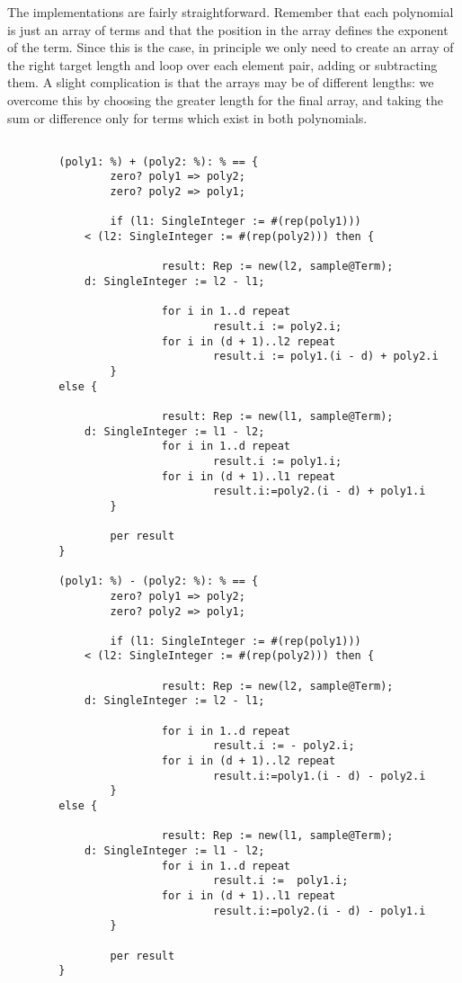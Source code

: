 The implementations are fairly straightforward. 
Remember that each polynomial
is just an array of terms and that the position in the array defines
the exponent of the term. Since this is the case,
in principle we only need to 
create an array of the right target length and loop over each element
pair, adding or subtracting them.
A slight complication is that the arrays may be of different lengths:
we overcome this by choosing the greater length for the final array,
and taking the sum or difference only for terms which exist in both
polynomials.

\begin{small}
\begin{verbatim}

        (poly1: %) + (poly2: %): % == {
                zero? poly1 => poly2;
                zero? poly2 => poly1;

                if (l1: SingleInteger := #(rep(poly1)))
		    < (l2: SingleInteger := #(rep(poly2))) then {

                        result: Rep := new(l2, sample@Term);
			d: SingleInteger := l2 - l1;

                        for i in 1..d repeat 
                                result.i := poly2.i;
                        for i in (d + 1)..l2 repeat 
                                result.i := poly1.(i - d) + poly2.i
                }
		else {

                        result: Rep := new(l1, sample@Term);
			d: SingleInteger := l1 - l2;
                        for i in 1..d repeat 
                                result.i := poly1.i;
                        for i in (d + 1)..l1 repeat 
                                result.i:=poly2.(i - d) + poly1.i
                }

                per result
        }

        (poly1: %) - (poly2: %): % == {
                zero? poly1 => poly2;
                zero? poly2 => poly1;

                if (l1: SingleInteger := #(rep(poly1)))
		    < (l2: SingleInteger := #(rep(poly2))) then {

                        result: Rep := new(l2, sample@Term);
			d: SingleInteger := l2 - l1;

                        for i in 1..d repeat 
                                result.i := - poly2.i;
                        for i in (d + 1)..l2 repeat 
                                result.i:=poly1.(i - d) - poly2.i
                }
		else {

                        result: Rep := new(l1, sample@Term);
			d: SingleInteger := l1 - l2;
                        for i in 1..d repeat 
                                result.i :=  poly1.i;
                        for i in (d + 1)..l1 repeat 
                                result.i:=poly2.(i - d) - poly1.i
                }

                per result
        }
\end{verbatim}
\end{small}

